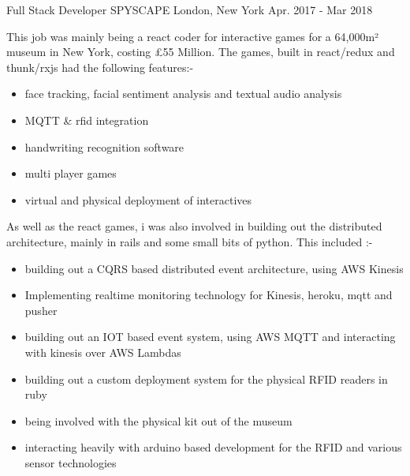 

\begin{cventries}

  \cventry
    {Full Stack Developer} %
    {SPYSCAPE} %
    {London, New York} %
    {Apr. 2017 - Mar 2018} %
    {
      This job was mainly being a react coder for interactive games for a 64,000m² museum in New York, costing £55 Million.
      \newline
      \vspace{0.25cm}
      The games, built in react/redux and thunk/rxjs had the following features:-
      \newline
      \begin{itemize} %
        \vspace{0.25cm}
        \setlength\itemsep{0.25em}
        \item {face tracking, facial sentiment analysis and textual audio analysis}
        \item {MQTT \& rfid integration}
        \item {handwriting recognition software}
        \item {multi player games}
        \item {virtual and physical deployment of interactives}
        \vspace{0.25cm}
      \end{itemize}
      As well as the react games, i was also involved in building out the distributed architecture, mainly in rails and some small bits of python. This included :-
      \vspace{0.25cm}
      \begin{itemize} %
        \setlength\itemsep{0.25em}
        \item {building out a CQRS based distributed event architecture, using AWS Kinesis}
        \item {Implementing realtime monitoring technology for Kinesis, heroku, mqtt and pusher}
        \item {building out an IOT based event system, using AWS MQTT and interacting with kinesis over AWS Lambdas}
        \item {building out a custom deployment system for the physical RFID readers in ruby}
        \item {being involved with the physical kit out of the museum}
        \item {interacting heavily with arduino based development for the RFID and various sensor technologies}
      \end{itemize}
    }


\end{cventries}
